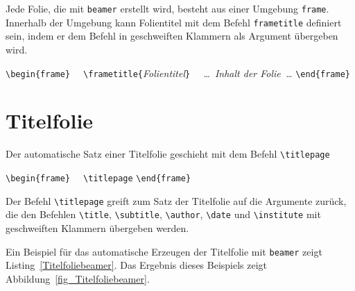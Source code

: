 \documentclass[a4paper,10pt,twoside]{scrbook}
\begin{document}
Jede Folie, die mit \verb|beamer| erstellt wird, besteht aus einer Umgebung \verb!frame!. Innerhalb der Umgebung kann Folientitel mit dem Befehl \verb|frametitle| definiert sein, indem er dem Befehl in geschweiften Klammern als Argument übergeben wird.


\begin{boxedminipage}{\textwidth}
\verb!\begin{frame}!\newline
\verb!  \frametitle{!\textsl{Folientitel}\verb!}! \newline
\verb!  !\textsl{\dots\ Inhalt der Folie\ \dots} \newline
\verb!\end{frame}!
\end{boxedminipage}


\section{Titelfolie}


Der automatische Satz einer Titelfolie geschieht mit dem Befehl \verb!\titlepage!

\begin{boxedminipage}{\textwidth}
\verb!\begin{frame}!\newline
\verb!  \titlepage! \newline
\verb!\end{frame}!
\end{boxedminipage}

Der Befehl \verb!\titlepage! greift zum Satz der Titelfolie auf die 
Argumente zurück, die den Befehlen
\verb|\title|, 
\verb|\subtitle|, 
\verb|\author|, 
\verb|\date| und
\verb|\institute| mit geschweiften Klammern übergeben werden.



Ein Beispiel für das automatische Erzeugen der Titelfolie mit \verb|beamer| zeigt Listing~\ref{Titelfoliebeamer}. Das Ergebnis dieses Beispiels zeigt Abbildung~\ref{fig_Titelfoliebeamer}.


\end{document}
